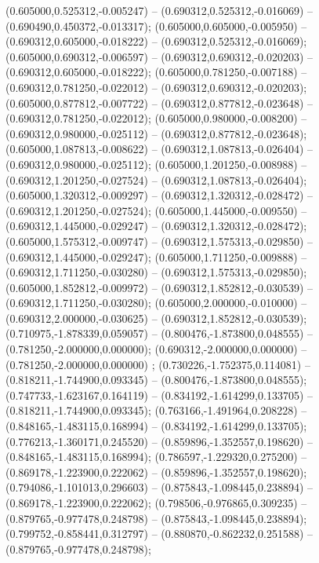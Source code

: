  (0.605000,0.525312,-0.005247) -- (0.690312,0.525312,-0.016069) -- (0.690490,0.450372,-0.013317);
 (0.605000,0.605000,-0.005950) -- (0.690312,0.605000,-0.018222) -- (0.690312,0.525312,-0.016069);
 (0.605000,0.690312,-0.006597) -- (0.690312,0.690312,-0.020203) -- (0.690312,0.605000,-0.018222);
 (0.605000,0.781250,-0.007188) -- (0.690312,0.781250,-0.022012) -- (0.690312,0.690312,-0.020203);
 (0.605000,0.877812,-0.007722) -- (0.690312,0.877812,-0.023648) -- (0.690312,0.781250,-0.022012);
 (0.605000,0.980000,-0.008200) -- (0.690312,0.980000,-0.025112) -- (0.690312,0.877812,-0.023648);
 (0.605000,1.087813,-0.008622) -- (0.690312,1.087813,-0.026404) -- (0.690312,0.980000,-0.025112);
 (0.605000,1.201250,-0.008988) -- (0.690312,1.201250,-0.027524) -- (0.690312,1.087813,-0.026404);
 (0.605000,1.320312,-0.009297) -- (0.690312,1.320312,-0.028472) -- (0.690312,1.201250,-0.027524);
 (0.605000,1.445000,-0.009550) -- (0.690312,1.445000,-0.029247) -- (0.690312,1.320312,-0.028472);
 (0.605000,1.575312,-0.009747) -- (0.690312,1.575313,-0.029850) -- (0.690312,1.445000,-0.029247);
 (0.605000,1.711250,-0.009888) -- (0.690312,1.711250,-0.030280) -- (0.690312,1.575313,-0.029850);
 (0.605000,1.852812,-0.009972) -- (0.690312,1.852812,-0.030539) -- (0.690312,1.711250,-0.030280);
 (0.605000,2.000000,-0.010000) -- (0.690312,2.000000,-0.030625) -- (0.690312,1.852812,-0.030539);
 (0.710975,-1.878339,0.059057) -- (0.800476,-1.873800,0.048555) -- (0.781250,-2.000000,0.000000);
 (0.690312,-2.000000,0.000000) -- (0.781250,-2.000000,0.000000) ;
 (0.730226,-1.752375,0.114081) -- (0.818211,-1.744900,0.093345) -- (0.800476,-1.873800,0.048555);
 (0.747733,-1.623167,0.164119) -- (0.834192,-1.614299,0.133705) -- (0.818211,-1.744900,0.093345);
 (0.763166,-1.491964,0.208228) -- (0.848165,-1.483115,0.168994) -- (0.834192,-1.614299,0.133705);
 (0.776213,-1.360171,0.245520) -- (0.859896,-1.352557,0.198620) -- (0.848165,-1.483115,0.168994);
 (0.786597,-1.229320,0.275200) -- (0.869178,-1.223900,0.222062) -- (0.859896,-1.352557,0.198620);
 (0.794086,-1.101013,0.296603) -- (0.875843,-1.098445,0.238894) -- (0.869178,-1.223900,0.222062);
 (0.798506,-0.976865,0.309235) -- (0.879765,-0.977478,0.248798) -- (0.875843,-1.098445,0.238894);
 (0.799752,-0.858441,0.312797) -- (0.880870,-0.862232,0.251588) -- (0.879765,-0.977478,0.248798);
